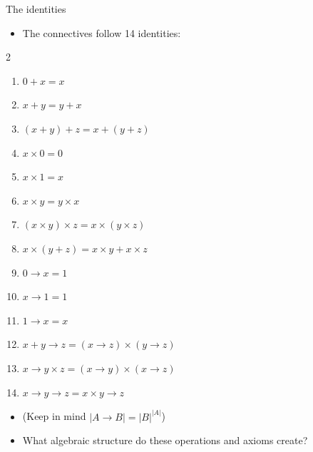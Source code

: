\documentclass{beamer}
\begin{document}
\begin{frame}{The identities}
    \begin{itemize}
        \item The connectives follow 14 identities:
    \end{itemize}

    \begin{multicols}{2}
        \begin{enumerate}
            \item $0 + x = x$
            \item $x + y = y + x$
            \item $(x + y) + z = x + (y + z)$
            \item $x \times 0 = 0$
            \item $x \times 1 = x$
            \item $x \times y = y \times x$
            \item $(x \times y) \times z = x \times (y \times z)$
            \item $x \times (y + z) = x \times y + x \times z$
            \item $0 \to x = 1$
            \item $x \to 1 = 1$
            \item $1 \to x = x$
            \item $x + y \to z = (x \to z) \times (y \to z)$
            \item $x \to y \times z = (x \to y) \times (x \to z)$
            \item $x \to y \to z = x \times y \to z$
        \end{enumerate}
    \end{multicols}
    
    \begin{itemize}
        \item (Keep in mind $|A \to B| = |B|^{|A|}$)
        \item What algebraic structure do these operations and axioms create?
    \end{itemize}
\end{frame}
\end{document}
